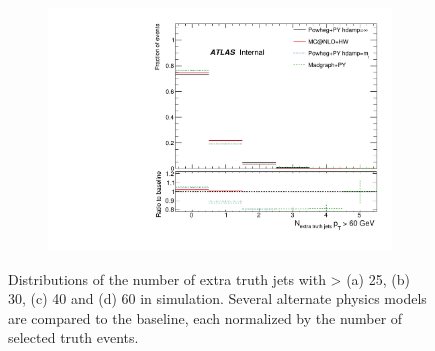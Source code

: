 \begin{figure}
\begin{subfigure}[]{0.45\textwidth}
\end{subfigure}
\begin{subfigure}[]{0.45\textwidth}
\includegraphics[width=\textwidth]{fig/MCComp/NTruthExtraJets60.pdf}
\end{subfigure}
\caption{Distributions of the number of extra truth jets with \pt > (a) 25, (b) 30, (c) 40 and (d) 60 \GeV in \ttbar simulation. Several alternate physics models are compared to the baseline, each normalized by the number of selected truth events.}
\label{fig:ntruthjets}
\end{figure}
